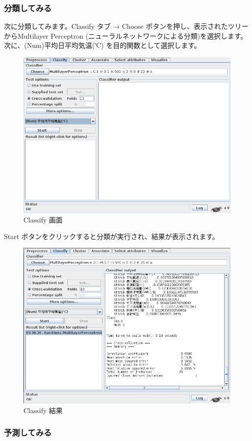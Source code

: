 \documentclass[mingoth,a4paper]{jsarticle}
\begin{document}
\subsubsection{分類してみる}

次に分類してみます。Classify タブ → Choose ボタンを押し、表示されたツリー
からMultilayer Perceptron (ニューラルネットワークによる分類)を選択します。
次に、(Num)平均日平均気温(℃) を目的関数として選択します。

\begin{figure}[H]
\begin{center}
\caption{Classify 画面}
\includegraphics[width=0.6\hsize]{image201003/weka6.png}
\end{center}
\end{figure}

Start ボタンをクリックすると分類が実行され、結果が表示されます。

\begin{figure}[H]
\begin{center}
\caption{Classify 結果}
\includegraphics[width=0.6\hsize]{image201003/weka7.png}
\end{center}
\end{figure}

\subsubsection{予測してみる}
\end{document}
